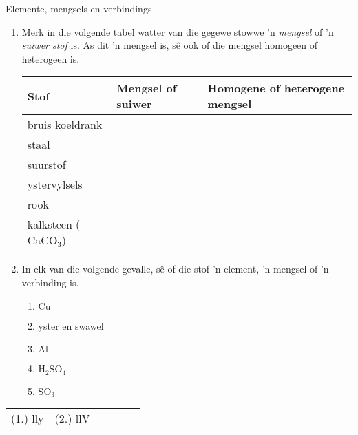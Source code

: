             \begin{exercises}{Elemente, mengsels en verbindings}{
            \nopagebreak
            \label{m38708*id63472}
 \begin{enumerate}[noitemsep, label=\textbf{\arabic*}. ] 
            \label{m38708*uid28}
    \item Merk in die volgende tabel watter van die gegewe stowwe 'n \textsl{mengsel} of 'n \textsl{suiwer stof} is. As dit 'n mengsel is, sê ook of die mengsel homogeen of heterogeen is.
          \begin{table}[H]
        \begin{center}
      \label{m38708*id63499}
    \noindent
      \begin{tabular}{|l|l|l|}\hline
        \textbf{Stof} &
        \textbf{Mengsel of suiwer} &
        \textbf{Homogene of heterogene mengsel} \\ \hline
        bruis koeldrank & & \\ \hline
        staal & & \\ \hline
        suurstof & & \\ \hline
        ystervylsels & & \\ \hline
        rook & & \\ \hline
        kalksteen (${\text{CaCO}}_{3}$) & & \\ \hline
    \end{tabular}
      \end{center}
\end{table}
    \par
\label{m38708*uid29}\item In elk van die volgende gevalle, sê of die stof 'n element, 'n mengsel of 'n verbinding is.
\label{m38708*id63912}\begin{enumerate}[noitemsep, label=\textbf{\alph*}. ] 
            \label{m38708*uid30}\item $\text{Cu}$
\label{m38708*uid31}\item yster en swawel
\label{m38708*uid32}\item $\text{Al}$
\label{m38708*uid33}\item $\text{H}{}_{2}\text{SO}{}_{4}$
\label{m38708*uid34}\item $\text{SO}{}_{3}$\end{enumerate}
                \end{enumerate}

\practiceinfo
\begin{tabular}[h]{cccccc}
 (1.) lly  &  (2.) llV  & 
\end{tabular}
}
\end{exercises}
